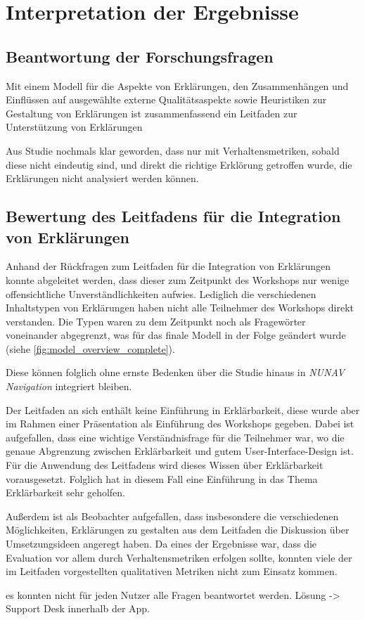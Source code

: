 \section{Interpretation der Ergebnisse}

\subsection*{Beantwortung der Forschungsfragen}

Mit einem Modell für die Aspekte von Erklärungen, den Zusammenhängen und Einflüssen auf ausgewählte externe Qualitätsaspekte sowie Heuristiken zur Gestaltung von Erklärungen ist zusammenfassend ein Leitfaden zur Unterstützung von Erklärungen

Aus Studie nochmals klar geworden, dass nur mit Verhaltensmetriken, sobald diese nicht eindeutig sind, und direkt die \glqq richtige\grqq{} Erklörung getroffen wurde, die Erklärungen nicht analysiert werden können.

\subsection*{Bewertung des Leitfadens für die Integration von Erklärungen}

Anhand der Rückfragen zum Leitfaden für die Integration von Erklärungen konnte abgeleitet werden, dass dieser zum Zeitpunkt des Workshops nur wenige offensichtliche Unverständlichkeiten aufwies. Lediglich die verschiedenen Inhaltstypen von Erklärungen haben nicht alle Teilnehmer des Workshops direkt verstanden. Die Typen waren zu dem Zeitpunkt noch als Fragewörter voneinander abgegrenzt, was für das finale Modell in der Folge geändert wurde (siehe \autoref{fig:model_overview_complete}).

Diese können folglich ohne ernste Bedenken über die Studie hinaus in \textit{NUNAV Navigation} integriert bleiben.

Der Leitfaden an sich enthält keine Einführung in Erklärbarkeit, diese wurde aber im Rahmen einer Präsentation als Einführung des Workshops gegeben. Dabei ist aufgefallen, dass eine wichtige Verständnisfrage für die Teilnehmer war, wo die genaue Abgrenzung zwischen Erklärbarkeit und gutem User-Interface-Design ist. Für die Anwendung des Leitfadens wird dieses Wissen über Erklärbarkeit vorausgesetzt. Folglich hat in diesem Fall eine Einführung in das Thema Erklärbarkeit sehr geholfen.

Außerdem ist als Beobachter aufgefallen, dass insbesondere die verschiedenen Möglichkeiten, Erklärungen zu gestalten aus dem Leitfaden die Diskussion über Umsetzungsideen angeregt haben. Da eines der Ergebnisse war, dass die Evaluation vor allem durch Verhaltensmetriken erfolgen sollte, konnten viele der im Leitfaden vorgestellten qualitativen Metriken nicht zum Einsatz kommen.

es konnten nicht für jeden Nutzer alle Fragen beantwortet werden. Lösung -> Support Desk innerhalb der App.